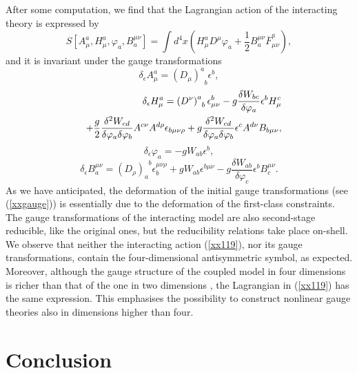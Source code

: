 \documentclass[a4paper,12pt]{article}
\begin{document}
After some computation, we find that the Lagrangian action of the
interacting theory is expressed by 
\begin{equation}
S[A_{\mu }^{a},H_{\mu }^{a},\varphi _{a},B_{a}^{\mu \nu }]=\int d^{4}x\left(
H_{\mu }^{a}D^{\mu }\varphi _{a}+\frac{1}{2}B_{a}^{\mu \nu }\overline{F}%
_{\mu \nu }^{a}\right) ,  \label{xx119}
\end{equation}
and it is invariant under the gauge transformations 
\begin{equation}
\delta _{\epsilon }A_{\mu }^{a}=\left( D_{\mu }\right) _{\;\;b}^{a}\epsilon
^{b},  \label{xx121}
\end{equation}
\begin{eqnarray}
&&\delta _{\epsilon }H_{\mu }^{a}=\left( D^{\nu }\right)
_{\;\;b}^{a}\epsilon _{\mu \nu }^{b}-g\frac{\delta W_{bc}}{\delta \varphi
_{a}}\epsilon ^{b}H_{\mu }^{c}  \nonumber \\
&&+\frac{g}{2}\frac{\delta ^{2}W_{cd}}{\delta \varphi _{a}\delta \varphi _{b}%
}A^{c\nu }A^{d\rho }\epsilon _{b\mu \nu \rho }+g\frac{\delta ^{2}W_{cd}}{%
\delta \varphi _{a}\delta \varphi _{b}}\epsilon ^{c}A^{d\nu }B_{b\mu \nu },
\label{xx122}
\end{eqnarray}
\begin{equation}
\delta _{\epsilon }\varphi _{a}=-gW_{ab}\epsilon ^{b},  \label{xx120}
\end{equation}
\begin{equation}
\delta _{\epsilon }B_{a}^{\mu \nu }=\left( D_{\rho }\right)
_{a}^{\;\;b}\epsilon _{b}^{\mu \nu \rho }+gW_{ab}\epsilon ^{b\mu \nu }-g%
\frac{\delta W_{ab}}{\delta \varphi _{c}}\epsilon ^{b}B_{c}^{\mu \nu }.
\label{xx123}
\end{equation}
As we have anticipated, the deformation of the initial gauge transformations
(see (\ref{xxgauge})) is essentially due to the deformation of the
first-class constraints. The gauge transformations of the interacting model
are also second-stage reducible, like the original ones, but the
reducibility relations take place on-shell. We observe that neither the
interacting action (\ref{xx119}), nor its gauge transformations, contain the
four-dimensional antisymmetric symbol, as expected. Moreover, although the
gauge structure of the coupled model in four dimensions is richer than that
of the one in two dimensions \cite{mpla}, the Lagrangian in (\ref{xx119})
has the same expression. This emphasises the possibility to construct
nonlinear gauge theories also in dimensions higher than four.

\section{Conclusion}
\end{document}
